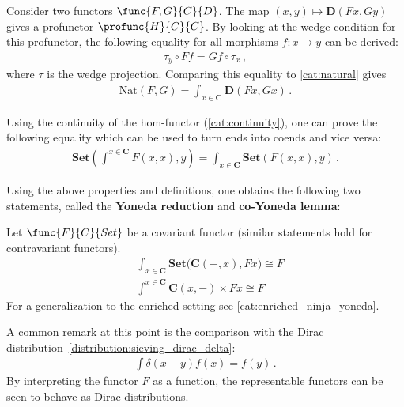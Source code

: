     \begin{example}
        Consider two functors $\func{F,G}{C}{D}$. The map $(x,y)\mapsto\mathbf{D}(Fx,Gy)$ gives a profunctor $\profunc{H}{C}{C}$. By looking at the wedge condition for this profunctor, the following equality for all morphisms $f:x\rightarrow y$ can be derived:
        \begin{gather}
            \tau_y\circ Ff = Gf\circ\tau_x\,,
        \end{gather}
        where $\tau$ is the wedge projection. Comparing this equality to \cref{cat:natural} gives
        \begin{gather}
            \label{cat:natural_end}
            \mathrm{Nat}(F,G) = \int_{x\in\mathbf{C}}\mathbf{D}(Fx,Gx)\,.
        \end{gather}
    \end{example}

    \begin{property}
        Using the continuity of the hom-functor (\cref{cat:continuity}), one can prove the following equality which can be used to turn ends into coends and vice versa:
        \begin{gather}
            \mathbf{Set}\left(\int^{x\in\mathbf{C}}F(x,x),y\right) = \int_{x\in\mathbf{C}}\mathbf{Set}\left(F(x,x),y\right)\,.
        \end{gather}
    \end{property}

    Using the above properties and definitions, one obtains the following two statements, called the \textbf{Yoneda reduction} and \textbf{co-Yoneda lemma}:
    \begin{property}\label{cat:ninja_yoneda}
        Let $\func{F}{C}{Set}$ be a covariant functor (similar statements hold for contravariant functors).
        \begin{align}
            &\int_{x\in\mathbf{C}}\mathbf{Set}\bigl(\mathbf{C}(-,x),Fx\bigr)\cong F\\
            &\int^{x\in\mathbf{C}}\mathbf{C}(x,-)\times Fx\cong F
        \end{align}
        For a generalization to the enriched setting see \cref{cat:enriched_ninja_yoneda}.
    \end{property}
    \begin{remark}
        A common remark at this point is the comparison with the Dirac distribution~\eqref{distribution:sieving_dirac_delta}:
        \begin{gather}
            \int \delta(x-y)f(x) = f(y)\,.
        \end{gather}
        By interpreting the functor $F$ as a function, the representable functors can be seen to behave as Dirac distributions.
    \end{remark}

